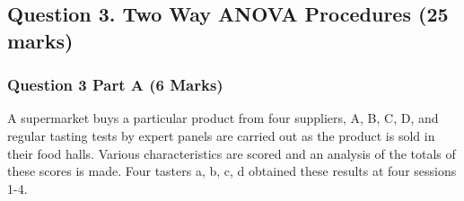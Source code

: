 \documentclass[a4paper,12pt]{article}
\begin{document}
%
%
%	
%	
%	

\newpage

\subsection*{Question 3. Two Way ANOVA Procedures (25 marks) }
\subsubsection*{Question 3 Part A (6 Marks)}
 A supermarket buys a particular product from four suppliers, A, B, C, D, and regular tasting tests by expert panels 
are carried out as the product is sold in their food halls. 
Various characteristics are scored and an analysis of the totals of these scores is made. 
Four tasters a, b, c, d obtained these results at four sessions 1-4.
\end{document}
